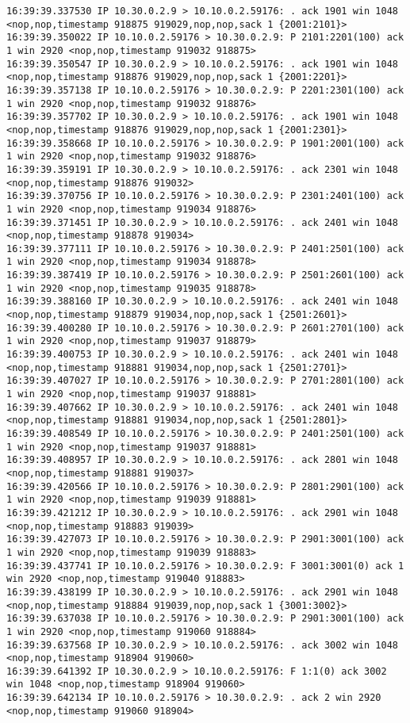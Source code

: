 \documentclass[a4paper,12pt]{article}
\begin{document}
\begin{Verbatim}
16:39:39.337530 IP 10.30.0.2.9 > 10.10.0.2.59176: . ack 1901 win 1048 <nop,nop,timestamp 918875 919029,nop,nop,sack 1 {2001:2101}>
16:39:39.350022 IP 10.10.0.2.59176 > 10.30.0.2.9: P 2101:2201(100) ack 1 win 2920 <nop,nop,timestamp 919032 918875>
16:39:39.350547 IP 10.30.0.2.9 > 10.10.0.2.59176: . ack 1901 win 1048 <nop,nop,timestamp 918876 919029,nop,nop,sack 1 {2001:2201}>
16:39:39.357138 IP 10.10.0.2.59176 > 10.30.0.2.9: P 2201:2301(100) ack 1 win 2920 <nop,nop,timestamp 919032 918876>
16:39:39.357702 IP 10.30.0.2.9 > 10.10.0.2.59176: . ack 1901 win 1048 <nop,nop,timestamp 918876 919029,nop,nop,sack 1 {2001:2301}>
16:39:39.358668 IP 10.10.0.2.59176 > 10.30.0.2.9: P 1901:2001(100) ack 1 win 2920 <nop,nop,timestamp 919032 918876>
16:39:39.359191 IP 10.30.0.2.9 > 10.10.0.2.59176: . ack 2301 win 1048 <nop,nop,timestamp 918876 919032>
16:39:39.370756 IP 10.10.0.2.59176 > 10.30.0.2.9: P 2301:2401(100) ack 1 win 2920 <nop,nop,timestamp 919034 918876>
16:39:39.371451 IP 10.30.0.2.9 > 10.10.0.2.59176: . ack 2401 win 1048 <nop,nop,timestamp 918878 919034>
16:39:39.377111 IP 10.10.0.2.59176 > 10.30.0.2.9: P 2401:2501(100) ack 1 win 2920 <nop,nop,timestamp 919034 918878>
16:39:39.387419 IP 10.10.0.2.59176 > 10.30.0.2.9: P 2501:2601(100) ack 1 win 2920 <nop,nop,timestamp 919035 918878>
16:39:39.388160 IP 10.30.0.2.9 > 10.10.0.2.59176: . ack 2401 win 1048 <nop,nop,timestamp 918879 919034,nop,nop,sack 1 {2501:2601}>
16:39:39.400280 IP 10.10.0.2.59176 > 10.30.0.2.9: P 2601:2701(100) ack 1 win 2920 <nop,nop,timestamp 919037 918879>
16:39:39.400753 IP 10.30.0.2.9 > 10.10.0.2.59176: . ack 2401 win 1048 <nop,nop,timestamp 918881 919034,nop,nop,sack 1 {2501:2701}>
16:39:39.407027 IP 10.10.0.2.59176 > 10.30.0.2.9: P 2701:2801(100) ack 1 win 2920 <nop,nop,timestamp 919037 918881>
16:39:39.407662 IP 10.30.0.2.9 > 10.10.0.2.59176: . ack 2401 win 1048 <nop,nop,timestamp 918881 919034,nop,nop,sack 1 {2501:2801}>
16:39:39.408549 IP 10.10.0.2.59176 > 10.30.0.2.9: P 2401:2501(100) ack 1 win 2920 <nop,nop,timestamp 919037 918881>
16:39:39.408957 IP 10.30.0.2.9 > 10.10.0.2.59176: . ack 2801 win 1048 <nop,nop,timestamp 918881 919037>
16:39:39.420566 IP 10.10.0.2.59176 > 10.30.0.2.9: P 2801:2901(100) ack 1 win 2920 <nop,nop,timestamp 919039 918881>
16:39:39.421212 IP 10.30.0.2.9 > 10.10.0.2.59176: . ack 2901 win 1048 <nop,nop,timestamp 918883 919039>
16:39:39.427073 IP 10.10.0.2.59176 > 10.30.0.2.9: P 2901:3001(100) ack 1 win 2920 <nop,nop,timestamp 919039 918883>
16:39:39.437741 IP 10.10.0.2.59176 > 10.30.0.2.9: F 3001:3001(0) ack 1 win 2920 <nop,nop,timestamp 919040 918883>
16:39:39.438199 IP 10.30.0.2.9 > 10.10.0.2.59176: . ack 2901 win 1048 <nop,nop,timestamp 918884 919039,nop,nop,sack 1 {3001:3002}>
16:39:39.637038 IP 10.10.0.2.59176 > 10.30.0.2.9: P 2901:3001(100) ack 1 win 2920 <nop,nop,timestamp 919060 918884>
16:39:39.637568 IP 10.30.0.2.9 > 10.10.0.2.59176: . ack 3002 win 1048 <nop,nop,timestamp 918904 919060>
16:39:39.641392 IP 10.30.0.2.9 > 10.10.0.2.59176: F 1:1(0) ack 3002 win 1048 <nop,nop,timestamp 918904 919060>
16:39:39.642134 IP 10.10.0.2.59176 > 10.30.0.2.9: . ack 2 win 2920 <nop,nop,timestamp 919060 918904>
\end{Verbatim}
\end{document}
